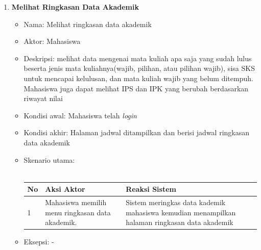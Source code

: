 \begin{enumerate}
	\item \textbf{Melihat Ringkasan Data Akademik}
		\begin{itemize}
			\item Nama: Melihat ringkasan data akademik
			\item Aktor: Mahasiswa
			\item Deskripsi: melihat data mengenai mata kuliah apa saja yang sudah lulus beserta jenis mata kuliahnya(wajib, pilihan, atau pilihan wajib), sisa SKS untuk mencapai kelulusan, dan mata kuliah wajib yang belum ditempuh. Mahasiswa juga dapat melihat IPS dan IPK yang berubah berdasarkan riwayat nilai
			\item Kondisi awal: Mahasiswa telah \textit{login}
			\item Kondisi akhir: Halaman jadwal ditampilkan dan berisi jadwal ringkasan data akademik
			\item Skenario utama: \\ \\
			\begin{tabular}{|p{0.5cm} |p{6cm}| p{6cm}|}
						\hline
							No 	& Aksi Aktor & Reaksi Sistem \\ \hline
							1 	& Mahasiswa memilih menu ringkasan data akademik. 	&	Sistem meringkas data kademik mahasiswa kemudian menampilkan halaman ringkasan data akademik \\ \hline 
						\end{tabular} 
			\item Eksepsi: -
		\end{itemize}
\end{enumerate}


